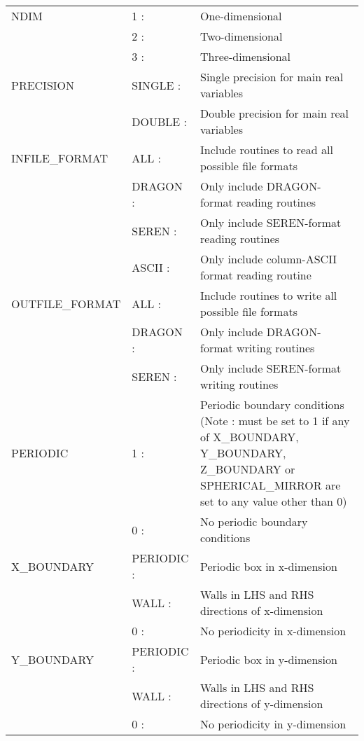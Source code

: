 \documentclass[a4paper]{article}
\begin{document}
\begin{center}
\begin{supertabular}{|p{4.6cm}|p{4.6cm} p{6.4cm}|}
 NDIM          & 1 :& One-dimensional \\
               & 2 :& Two-dimensional \\
               & 3 :& Three-dimensional \\ \hline

 PRECISION     & SINGLE :& Single precision for main real variables \\
               & DOUBLE :& Double precision for main real variables \\ \hline

 INFILE\_FORMAT & ALL       :& Include routines to read all possible file formats \\
                & DRAGON    :& Only include DRAGON-format reading routines \\
                & SEREN     :& Only include SEREN-format reading routines \\
                & ASCII     :& Only include column-ASCII format reading routine \\ \hline

 OUTFILE\_FORMAT & ALL       :& Include routines to write all possible file formats \\
                 & DRAGON    :& Only include DRAGON-format writing routines \\
                 & SEREN     :& Only include SEREN-format writing routines \\ \hline

 PERIODIC      & 1 :& Periodic boundary conditions (Note : must be set to 1 if any of X\_BOUNDARY, Y\_BOUNDARY, Z\_BOUNDARY or SPHERICAL\_MIRROR are set to any value other than 0) \\
               & 0 :& No periodic boundary conditions \\ \hline

 X\_BOUNDARY   & PERIODIC :& Periodic box in x-dimension  \\
               & WALL     :& Walls in LHS and RHS directions of x-dimension \\
               & 0        :& No periodicity in x-dimension \\ \hline

 Y\_BOUNDARY   & PERIODIC :& Periodic box in y-dimension \\
               & WALL     :& Walls in LHS and RHS directions of y-dimension \\
               & 0        :& No periodicity in y-dimension \\ \hline


\end{supertabular}
\end{center}
\end{document}
